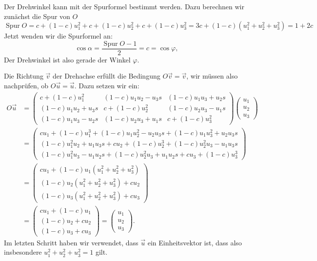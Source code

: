 \begin{loesung}
\begin{teilaufgaben}
\item
Der Drehwinkel kann mit der Spurformel bestimmt werden. Dazu berechnen
wir zunächst die Spur von $O$
\[
\operatorname{Spur}O=
c+(1-c)u_1^2+c+(1-c)u_2^2+c+(1-c)u_3^2=3c+(1-c)(u_1^2+u_2^2+u_3^2)=1+2c
\]
Jetzt wenden wir die Spurformel an:
\[
\cos\alpha=\frac{\operatorname{Spur}O-1}2=c=\cos\varphi,
\]
Der Drehwinkel ist also gerade der Winkel $\varphi.$
\item
Die Richtung $\vec v$ der Drehachse erfüllt die Bedingung $O\vec v=\vec v$,
wir müssen also nachprüfen, ob $O\vec u=\vec u$.
Dazu setzen wir ein:
\begin{align*}
O\vec u
&=
\begin{pmatrix}
c+(1-c)u_1^2    &(1-c)u_1u_2-u_3s   &(1-c)u_1u_3+u_2s\\
(1-c)u_1u_2+u_3s&c+(1-c)u_2^2       &(1-c)u_2u_3-u_1s\\
(1-c)u_1u_3-u_2s&(1-c)u_2u_3+u_1s   &c+(1-c)u_3^2
\end{pmatrix}
\begin{pmatrix}u_1\\u_2\\u_3\end{pmatrix}
\\
&=
\begin{pmatrix}
cu_1+(1-c)u_1^3 +(1-c)u_1u_2^2-u_2u_3s+(1-c)u_1u_3^2+u_2u_3s\\
(1-c)u_1^2u_2+u_1u_3s+cu_2+(1-c)u_2^3+(1-c)u_2^2u_3-u_1u_3s\\
(1-c)u_1^2u_3-u_1u_2s+(1-c)u_2^2u_3+u_1u_2s+cu_3+(1-c)u_3^3
\end{pmatrix}
\\
&=
\begin{pmatrix}
cu_1+(1-c)u_1(u_1^2+u_2^2+u_3^2)\\
(1-c)u_2(u_1^2+u_2^2+u_3^2)+cu_2\\
(1-c)u_3(u_1^2+u_2^2+u_3^2)+cu_3
\end{pmatrix}
\\
&=
\begin{pmatrix}
cu_1+(1-c)u_1\\
(1-c)u_2+cu_2\\
(1-c)u_3+cu_3
\end{pmatrix}
=\begin{pmatrix}u_1\\u_2\\u_3\end{pmatrix}.
\end{align*}
Im letzten Schritt haben wir verwendet, dass $\vec u$ ein Einheitsvektor
ist, dass also insbesondere $u_1^2 + u_2^2 + u_3^2=1$ gilt.
\qedhere
\end{teilaufgaben}
\end{loesung}

